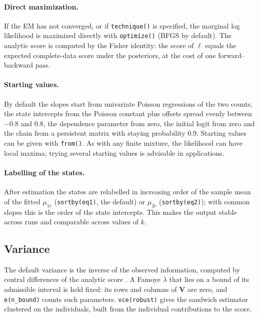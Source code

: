 \documentclass[11pt,a4paper]{article}
\newcommand{\cmd}[1]{\texttt{#1}}
\begin{document}
\paragraph{Direct maximization.} If the EM has not converged, or if \cmd{technique()} is specified,
the marginal log likelihood is maximized directly with \cmd{optimize()} (BFGS by default). The
analytic score is computed by the Fisher identity: the score of $\ell$ equals the expected
complete-data score under the posteriors, at the cost of one forward--backward pass.

\paragraph{Starting values.} By default the slopes start from univariate Poisson regressions of the
two counts, the state intercepts from the Poisson constant plus offsets spread evenly between $-0.8$
and $0.8$, the dependence parameter from zero, the initial logit from zero and the chain from a
persistent matrix with staying probability 0.9. Starting values can be given with \cmd{from()}. As
with any finite mixture, the likelihood can have local maxima; trying several starting values is
advisable in applications.

\paragraph{Labelling of the states.} After estimation the states are relabelled in increasing order of
the sample mean of the fitted $\mu_{1c}$ (\cmd{sortby(eq1)}, the default) or $\mu_{2c}$
(\cmd{sortby(eq2)}); with common slopes this is the order of the state intercepts. This makes the
output stable across runs and comparable across values of $k$.

\subsection{Variance}

The default variance is the inverse of the observed information, computed by central differences of
the analytic score \citep{mclachlan2000}. A Famoye $\lambda$ that lies on a bound of its admissible
interval is held fixed: its rows and columns of $\mathbf V$ are zero, and \cmd{e(n\_bound)} counts such
parameters. \cmd{vce(robust)} gives the sandwich estimator clustered on the individuals, built from the
individual contributions to the score.

\end{document}
